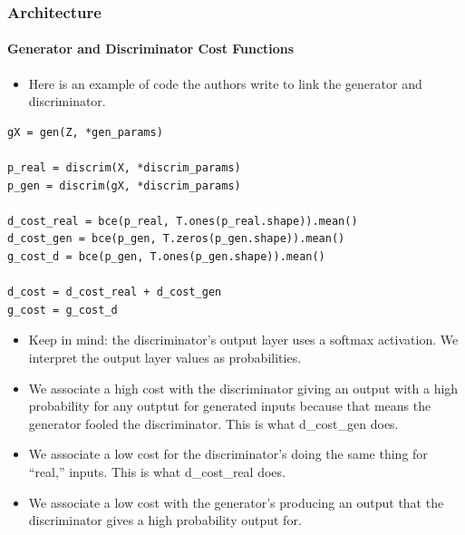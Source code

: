 \documentclass{beamer}
\begin{document}
\begin{frame}
\frametitle{Architecture}
\framesubtitle{Generator and Discriminator Cost Functions}
\begin{footnotesize}
\begin{itemize}
\item Here is an example of code the authors write to link the generator and
  discriminator.  
\end{itemize}
\end{footnotesize}
\begin{tiny}
\begin{lstlisting}
gX = gen(Z, *gen_params)

p_real = discrim(X, *discrim_params)
p_gen = discrim(gX, *discrim_params)

d_cost_real = bce(p_real, T.ones(p_real.shape)).mean()
d_cost_gen = bce(p_gen, T.zeros(p_gen.shape)).mean()
g_cost_d = bce(p_gen, T.ones(p_gen.shape)).mean()

d_cost = d_cost_real + d_cost_gen
g_cost = g_cost_d
\end{lstlisting}
\end{tiny}
\begin{footnotesize}
\begin{itemize}
\item Keep in mind: the discriminator's output layer uses a softmax activation.
  We interpret the output layer values as probabilities.

\item  We associate a high cost with the discriminator giving an output
with a high probability for any outptut for generated inputs because that means
the generator fooled the discriminator.  This is what d\_cost\_gen does.

\item We associate a low cost for the discriminator's doing the same thing for
``real,'' inputs.  This is what d\_cost\_real does.

\item We associate a low cost with the generator's producing an output that the 
  discriminator gives a high probability output for.

\end{itemize}
\end{footnotesize}
\end{frame}
\end{document}
